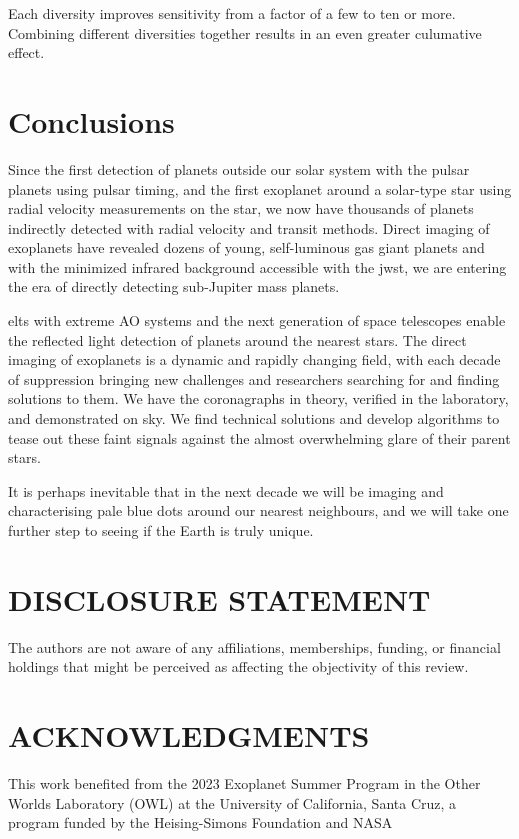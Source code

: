 \documentclass[letterpaper]{ar-1col}
\begin{document}
Each diversity improves sensitivity from a factor of a few to ten or more.
%
Combining different diversities together results in an even greater culumative effect.

\section{Conclusions}

Since the first detection of planets outside our solar system with the pulsar planets \citep{Wolszczan92} using pulsar timing, and the first exoplanet around a solar-type star \citep[51 Peg b; ][]{Mayor95} using radial velocity measurements on the star, we now have thousands of planets indirectly detected with radial velocity and transit methods.
%
Direct imaging of exoplanets have revealed dozens of young, self-luminous gas giant planets \citep{Currie23,Chauvin24} and with the minimized infrared background accessible with the \ac{jwst}, we are entering the era of directly detecting sub-Jupiter mass planets.

\acp{elt} with extreme AO systems and the next generation of space telescopes enable the reflected light detection of planets around the nearest stars.
%
The direct imaging of exoplanets is a dynamic and rapidly changing field, with each decade of suppression bringing new challenges and researchers searching for and finding solutions to them.
%
We have the coronagraphs in theory, verified in the laboratory, and demonstrated on sky.
%
We find technical solutions and develop algorithms to tease out these faint signals against the almost overwhelming glare of their parent stars.

It is perhaps inevitable that in the next decade we will be imaging and characterising pale blue dots around our nearest neighbours, and we will take one further step to seeing if the Earth is truly unique.

\section*{DISCLOSURE STATEMENT}
The authors are not aware of any affiliations, memberships, funding, or financial holdings that
might be perceived as affecting the objectivity of this review.

\section*{ACKNOWLEDGMENTS}
This work benefited from the 2023 Exoplanet Summer Program in the Other Worlds Laboratory (OWL) at the University of California, Santa Cruz, a program funded by the Heising-Simons Foundation and NASA
%
\end{document}
